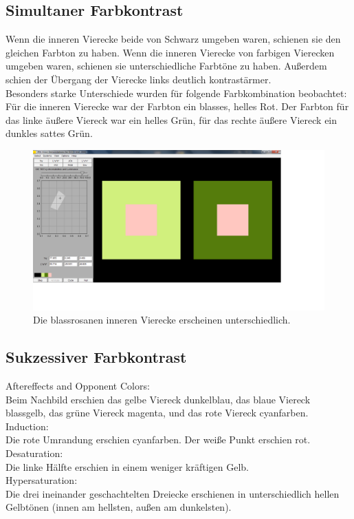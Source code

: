 \documentclass[a4paper]{article}
\begin{document}
\subsection{Simultaner Farbkontrast}
Wenn die inneren Vierecke beide von Schwarz umgeben waren, schienen sie den gleichen Farbton zu haben. Wenn die inneren Vierecke von farbigen Vierecken umgeben waren, schienen sie unterschiedliche Farbtöne zu haben. Außerdem schien der Übergang der Vierecke links deutlich kontrastärmer.\\
Besonders starke Unterschiede wurden für folgende Farbkombination beobachtet:\\
Für die inneren Vierecke war der Farbton ein blasses, helles Rot. Der Farbton für das linke äußere Viereck war ein helles Grün, für das rechte äußere Viereck ein dunkles sattes Grün.
\begin{figure}[H]
    \centering
    \includegraphics[width=\textwidth]{images/A7.png}
    \caption{Die blassrosanen inneren Vierecke erscheinen unterschiedlich.}
    \label{fig:A7}
\end{figure}

\subsection{Sukzessiver Farbkontrast}
Aftereffects and Opponent Colors:\\
Beim Nachbild erschien das gelbe Viereck dunkelblau, das blaue Viereck blassgelb, das grüne Viereck magenta, und das rote Viereck cyanfarben.\\
Induction:\\
Die rote Umrandung erschien cyanfarben. Der weiße Punkt erschien rot.\\
Desaturation:\\
Die linke Hälfte erschien in einem weniger kräftigen Gelb.\\
Hypersaturation:\\
Die drei ineinander geschachtelten Dreiecke erschienen in unterschiedlich hellen Gelbtönen (innen am hellsten, außen am dunkelsten).
\end{document}
